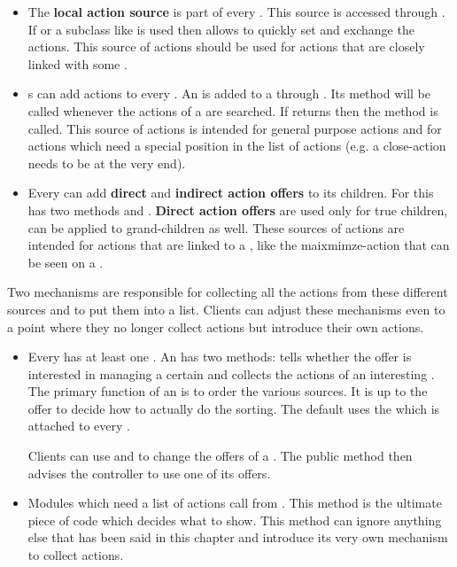 \begin{itemize}
 \item The \textbf{local action source} is part of every . This source is accessed through . If  or a subclass like  is used then  allows to quickly set and exchange the actions. This source of actions should be used for actions that are closely linked with some .
 \item {}s can add actions to every . An  is added to a  through . Its method  will be called whenever the actions of a  are searched. If  returns  then the method  is called. This source of actions is intended for general purpose actions and for actions which need a special position in the list of actions (e.g. a close-action needs to be at the very end).
 \item Every  can add \textbf{direct} and \textbf{indirect action offers} to its children. For this  has two methods  and . \textbf{Direct action offers} are used only for true children,  can be applied to grand-children as well. These sources of actions are intended for actions that are linked to a , like the maixmimze-action that can be seen on a .
\end{itemize}

Two mechanisms are responsible for collecting all the actions from these different sources and to put them into a list. Clients can adjust these mechanisms even to a point where they no longer collect actions but introduce their own actions.

\begin{itemize}
 \item Every  has at least one . An  has two methods:  tells whether the offer is interested in managing a certain  and  collects the actions of an interesting . The primary function of an  is to order the various sources. It is up to the offer to decide how to actually do the sorting. The default  uses the  which is attached to every .

Clients can use  and  to change the offers of a . The public method  then advises the controller to use one of its offers.

 \item Modules which need a list of actions call  from . This method is the ultimate piece of code which decides what to show. This method can ignore anything else that has been said in this chapter and introduce its very own mechanism to collect actions. 
\end{itemize}

